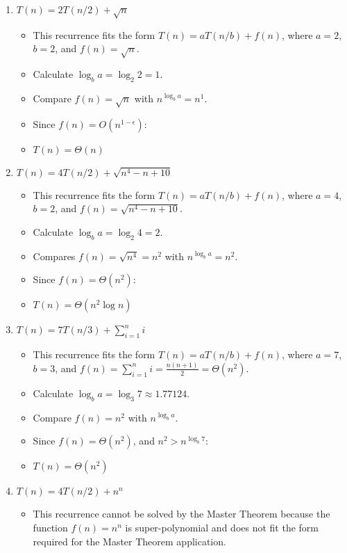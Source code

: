 \documentclass{article}
\begin{document}
\begin{enumerate}[label=(\alph*)]
    \item \( T(n) = 2T(n/2) + \sqrt{n} \)
    \begin{itemize}
        \item This recurrence fits the form \( T(n) = aT(n/b) + f(n) \), where \( a = 2 \), \( b = 2 \), and \( f(n) = \sqrt{n} \).
        \item Calculate \( \log_b{a} = \log_2{2} = 1 \).
        \item Compare \( f(n) = \sqrt{n} \) with \( n^{\log_b{a}} = n^1 \).
        \item Since \( f(n) = O(n^{1-\epsilon}) \):
        \item \( T(n) = \Theta(n) \)
    \end{itemize}

    \item \( T(n) = 4T(n/2) + \sqrt{n^4 - n + 10} \)
    \begin{itemize}
        \item This recurrence fits the form \( T(n) = aT(n/b) + f(n) \), where \( a = 4 \), \( b = 2 \), and \( f(n) = \sqrt{n^4 - n + 10} \).
        \item Calculate \( \log_b{a} = \log_2{4} = 2 \).
        \item Compares \( f(n) = \sqrt{n^4} = n^2 \) with \( n^{\log_b{a}} = n^2 \).
        \item Since \( f(n) = \Theta(n^2) \):
        \item \( T(n) = \Theta(n^2 \log n) \)
    \end{itemize}

    \item \( T(n) = 7T(n/3) + \sum_{i=1}^n i \)
    \begin{itemize}
        \item This recurrence fits the form \( T(n) = aT(n/b) + f(n) \), where \( a = 7 \), \( b = 3 \), and \( f(n) = \sum_{i=1}^n i = \frac{n(n+1)}{2} = \Theta(n^2) \).
        \item Calculate \( \log_b{a} = \log_3{7} \approx 1.77124 \).
        \item Compare \( f(n) = n^2 \) with \( n^{\log_b{a}} \).
        \item Since \( f(n) = \Theta(n^2) \), and \( n^2 > n^{\log_b{7}} \):
        \item \( T(n) = \Theta(n^2) \)
    \end{itemize}

    \item \( T(n) = 4T(n/2) + n^n \)
    \begin{itemize}
        \item This recurrence cannot be solved by the Master Theorem because the function \( f(n) = n^n \) is super-polynomial and does not fit the form required for the Master Theorem application.
    \end{itemize}


\end{enumerate}
\end{document}
